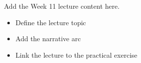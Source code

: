 Add the Week 11 lecture content here.

\begin{itemize}
  \item Define the lecture topic
  \item Add the narrative arc
  \item Link the lecture to the practical exercise
\end{itemize}
